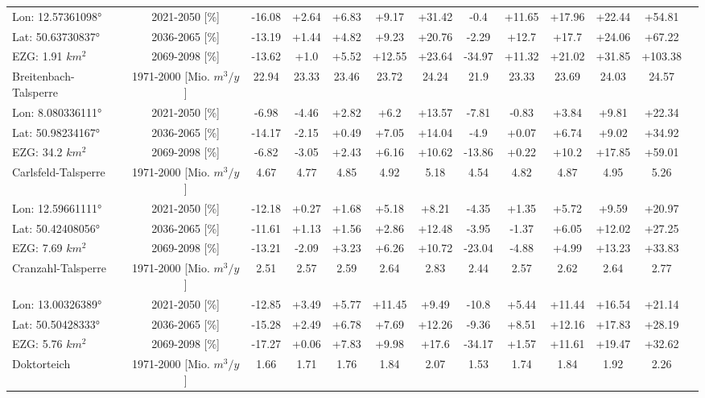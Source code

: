 \begin{longtable}{@{\extracolsep{\fill}}lc|ccccc||cccccc}
\cline{2-12} 
Lon: 12.57361098° & 2021-2050 [\%]  & -16.08 & +2.64 & +6.83 & +9.17 & +31.42 & -0.4 & +11.65 & +17.96 & +22.44 & +54.81\\ 
Lat: 50.63730837° & 2036-2065 [\%]  & -13.19 & +1.44 & +4.82 & +9.23 & +20.76 & -2.29 & +12.7 & +17.7 & +24.06 & +67.22\\ 
EZG: 1.91 $km^2$ & 2069-2098 [\%]  & -13.62 & +1.0 & +5.52 & +12.55 & +23.64 & -34.97 & +11.32 & +21.02 & +31.85 & +103.38\\ 
\hline 
Breitenbach-Talsperre & 1971-2000 [Mio. $m^3/y$]  & 22.94 & 23.33 & 23.46 & 23.72 & 24.24 & 21.9 & 23.33 & 23.69 & 24.03 & 24.57\\ 
\cline{2-12} 
Lon: 8.080336111° & 2021-2050 [\%]  & -6.98 & -4.46 & +2.82 & +6.2 & +13.57 & -7.81 & -0.83 & +3.84 & +9.81 & +22.34\\ 
Lat: 50.98234167° & 2036-2065 [\%]  & -14.17 & -2.15 & +0.49 & +7.05 & +14.04 & -4.9 & +0.07 & +6.74 & +9.02 & +34.92\\ 
EZG: 34.2 $km^2$ & 2069-2098 [\%]  & -6.82 & -3.05 & +2.43 & +6.16 & +10.62 & -13.86 & +0.22 & +10.2 & +17.85 & +59.01\\ 
\hline 
Carlsfeld-Talsperre & 1971-2000 [Mio. $m^3/y$]  & 4.67 & 4.77 & 4.85 & 4.92 & 5.18 & 4.54 & 4.82 & 4.87 & 4.95 & 5.26\\ 
\cline{2-12} 
Lon: 12.59661111° & 2021-2050 [\%]  & -12.18 & +0.27 & +1.68 & +5.18 & +8.21 & -4.35 & +1.35 & +5.72 & +9.59 & +20.97\\ 
Lat: 50.42408056° & 2036-2065 [\%]  & -11.61 & +1.13 & +1.56 & +2.86 & +12.48 & -3.95 & -1.37 & +6.05 & +12.02 & +27.25\\ 
EZG: 7.69 $km^2$ & 2069-2098 [\%]  & -13.21 & -2.09 & +3.23 & +6.26 & +10.72 & -23.04 & -4.88 & +4.99 & +13.23 & +33.83\\ 
\hline 
Cranzahl-Talsperre & 1971-2000 [Mio. $m^3/y$]  & 2.51 & 2.57 & 2.59 & 2.64 & 2.83 & 2.44 & 2.57 & 2.62 & 2.64 & 2.77\\ 
\cline{2-12} 
Lon: 13.00326389° & 2021-2050 [\%]  & -12.85 & +3.49 & +5.77 & +11.45 & +9.49 & -10.8 & +5.44 & +11.44 & +16.54 & +21.14\\ 
Lat: 50.50428333° & 2036-2065 [\%]  & -15.28 & +2.49 & +6.78 & +7.69 & +12.26 & -9.36 & +8.51 & +12.16 & +17.83 & +28.19\\ 
EZG: 5.76 $km^2$ & 2069-2098 [\%]  & -17.27 & +0.06 & +7.83 & +9.98 & +17.6 & -34.17 & +1.57 & +11.61 & +19.47 & +32.62\\ 
\hline 
Doktorteich & 1971-2000 [Mio. $m^3/y$]  & 1.66 & 1.71 & 1.76 & 1.84 & 2.07 & 1.53 & 1.74 & 1.84 & 1.92 & 2.26\\ 

\end{longtable}
